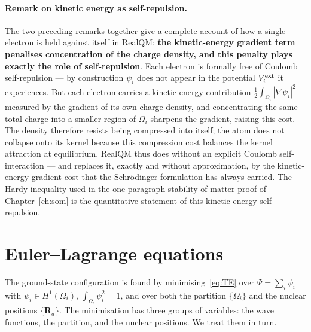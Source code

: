 \paragraph{Remark on kinetic energy as self-repulsion.}
The two preceding remarks together give a complete account of how a single electron is held against itself in RealQM: \textbf{the kinetic-energy gradient term penalises concentration of the charge density, and this penalty plays exactly the role of self-repulsion}. Each electron is formally free of Coulomb self-repulsion --- by construction $\psi_i$ does not appear in the potential $V_i^{\rm ext}$ it experiences. But each electron carries a kinetic-energy contribution $\tfrac{1}{2}\int_{\Omega_i} |\nabla \psi_i|^2$ measured by the gradient of its own charge density, and concentrating the same total charge into a smaller region of $\Omega_i$ sharpens the gradient, raising this cost. The density therefore resists being compressed into itself; the atom does not collapse onto its kernel because this compression cost balances the kernel attraction at equilibrium. RealQM thus does without an explicit Coulomb self-interaction --- and replaces it, exactly and without approximation, by the kinetic-energy gradient cost that the Schr\"odinger formulation has always carried. The Hardy inequality used in the one-paragraph stability-of-matter proof of Chapter~\ref{ch:som} is the quantitative statement of this kinetic-energy self-repulsion.

\section{Euler--Lagrange equations}\label{sec:euler-lagrange}

The ground-state configuration is found by minimising~\eqref{eq:TE} over $\Psi = \sum_i \psi_i$ with $\psi_i \in H^1(\Omega_i)$, $\int_{\Omega_i} \psi_i^2 = 1$, and over both the partition $\{\Omega_i\}$ and the nuclear positions $\{\mathbf{R}_a\}$. The minimisation has three groups of variables: the wave functions, the partition, and the nuclear positions. We treat them in turn.

